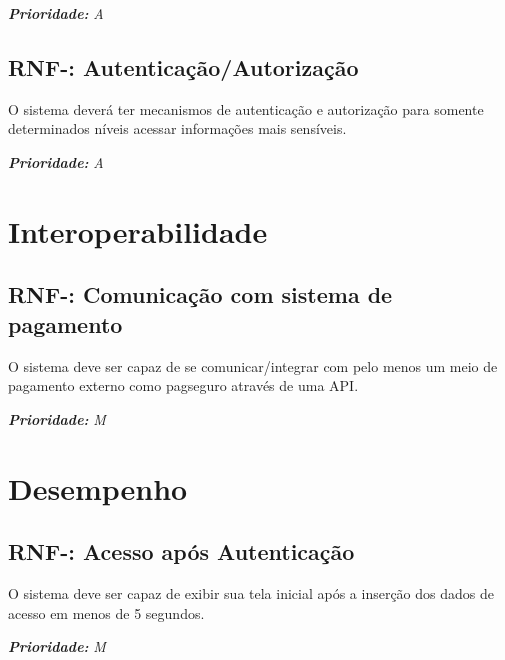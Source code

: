 \vspace{0.5cm}
\noindent\textbf{\textit{Prioridade:}} \textit{A}
\pgfmathtruncatemacro{}
\vspace{0.5cm}
\subsection{RNF-\nreqnf: Autenticação/Autorização}
O sistema deverá ter mecanismos de autenticação e autorização para somente determinados níveis acessar informações mais sensíveis.  

\vspace{0.5cm}
\noindent\textbf{\textit{Prioridade:}} \textit{A}
\vspace{0.5cm}
\section{Interoperabilidade}
\pgfmathtruncatemacro{}
\subsection{RNF-\nreqnf: Comunicação com sistema de pagamento}
O sistema deve ser capaz de se comunicar/integrar com pelo menos um meio de pagamento externo como pagseguro através de uma API.  

\vspace{0.5cm}
\noindent\textbf{\textit{Prioridade:}} \textit{M}
\vspace{0.5cm}
\section{Desempenho}
\pgfmathtruncatemacro{}
\subsection{RNF-\nreqnf: Acesso após Autenticação}
O sistema deve ser capaz de exibir sua tela inicial após a inserção dos dados de acesso em menos de 5 segundos.  

\vspace{0.5cm}
\noindent\textbf{\textit{Prioridade:}} \textit{M}
\vspace{0.5cm}